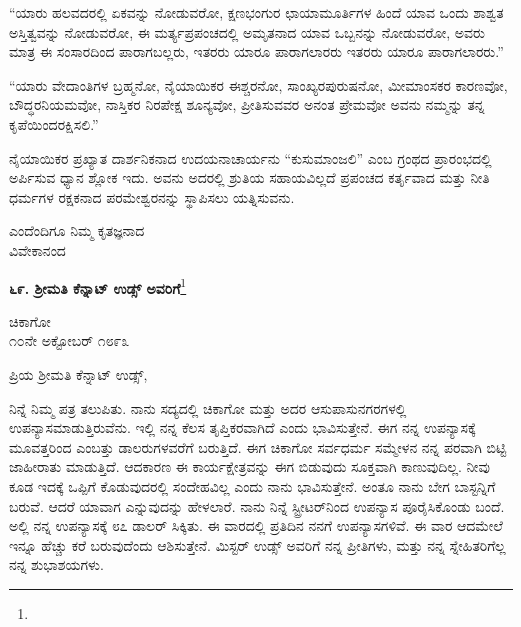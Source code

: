 “ಯಾರು ಹಲವದರಲ್ಲಿ ಏಕವನ್ನು ನೋಡುವರೋ, ಕ್ಷಣಭಂಗುರ ಛಾಯಾಮೂರ್ತಿ\break ಗಳ ಹಿಂದೆ ಯಾವ ಒಂದು ಶಾಶ್ವತ ಅಸ್ತಿತ್ವವನ್ನು ನೋಡುವರೋ, ಈ ಮರ್ತ್ಯಪ್ರಪಂಚದಲ್ಲಿ ಅಮೃತನಾದ ಯಾವ ಒಬ್ಬನನ್ನು ನೋಡುವರೋ, ಅವರು ಮಾತ್ರ ಈ ಸಂಸಾರದಿಂದ ಪಾರಾಗಬಲ್ಲರು, ಇತರರು ಯಾರೂ ಪಾರಾಗಲಾರರು\enginline{-} ಇತರರು ಯಾರೂ ಪಾರಾಗಲಾರರು.”

“ಯಾರು ವೇದಾಂತಿಗಳ ಬ್ರಹ್ಮನೋ, ನೈಯಾಯಿಕರ ಈಶ್ಚರನೋ, ಸಾಂಖ್ಯರ\break ಪುರುಷನೋ, ಮೀಮಾಂಸಕರ ಕಾರಣವೋ, ಬೌದ್ಧರನಿಯಮವೋ, ನಾಸ್ತಿಕರ ನಿರಪೇಕ್ಷ ಶೂನ್ಯವೋ, ಪ್ರೀತಿಸುವವರ ಅನಂತ ಪ್ರೇಮವೋ ಅವನು ನಮ್ಮನ್ನು ತನ್ನ ಕೃಪೆಯಿಂದ\break ರಕ್ಷಿಸಲಿ.”

ನೈಯಾಯಿಕರ ಪ್ರಖ್ಯಾತ ದಾರ್ಶನಿಕನಾದ ಉದಯನಾಚಾರ್ಯನು “ಕುಸುಮಾಂಜಲಿ” ಎಂಬ ಗ್ರಂಥದ ಪ್ರಾರಂಭದಲ್ಲಿ ಅರ್ಪಿಸುವ ಧ್ಯಾನ ಶ್ಲೋಕ ಇದು. ಅವನು ಅದರಲ್ಲಿ ಶ್ರುತಿಯ ಸಹಾಯವಿಲ್ಲದೆ ಪ್ರಪಂಚದ ಕರ್ತೃವಾದ ಮತ್ತು ನೀತಿ ಧರ್ಮಗಳ ರಕ್ಷಕನಾದ ಪರಮೇಶ್ವರನನ್ನು ಸ್ಥಾಪಿಸಲು ಯತ್ನಿಸುವನು.

\vspace{-.5cm}

{\flushright
ಎಂದೆಂದಿಗೂ ನಿಮ್ಮ ಕೃತಜ್ಞನಾದ\\ವಿವೇಕಾನಂದ\par}

\vspace{-.3cm}

\begin{center}
\textbf{೬೯. ಶ‍್ರೀಮತಿ ಕೆನ್ನಾಟ್ ಉಡ್ಸ್ ಅವರಿಗೆ}\footnote{}
\end{center}

\vspace{-.6cm}

\begin{flushright}
ಚಿಕಾಗೋ\\೧೦ನೇ ಅಕ್ಟೋಬರ್ ೧೮೯೩
\end{flushright}

\noindent
ಪ್ರಿಯ ಶ‍್ರೀಮತಿ ಕೆನ್ನಾಟ್ ಉಡ್ಸ್,

ನಿನ್ನೆ ನಿಮ್ಮ ಪತ್ರ ತಲುಪಿತು. ನಾನು ಸದ್ಯದಲ್ಲಿ ಚಿಕಾಗೋ ಮತ್ತು ಅದರ ಆಸುಪಾಸುನಗರಗಳಲ್ಲಿ ಉಪನ್ಯಾಸಮಾಡುತ್ತಿರುವೆನು. ಇಲ್ಲಿ ನನ್ನ ಕೆಲಸ ತೃಪ್ತಿಕರವಾಗಿದೆ ಎಂದು ಭಾವಿಸುತ್ತೇನೆ. ಈಗ ನನ್ನ ಉಪನ್ಯಾಸಕ್ಕೆ ಮೂವತ್ತರಿಂದ ಎಂಬತ್ತು ಡಾಲರುಗಳವರೆಗೆ ಬರುತ್ತಿದೆ. ಈಗ ಚಿಕಾಗೋ ಸರ್ವಧರ್ಮ ಸಮ್ಮೇಳನ ನನ್ನ ಪರವಾಗಿ ಬಿಟ್ಟಿ ಜಾಹೀರಾತು ಮಾಡುತ್ತಿದೆ. ಆದಕಾರಣ ಈ ಕಾರ್ಯಕ್ಷೇತ್ರವನ್ನು ಈಗ ಬಿಡುವುದು ಸೂಕ್ತವಾಗಿ ಕಾಣುವುದಿಲ್ಲ. ನೀವು ಕೂಡ ಇದಕ್ಕೆ ಒಪ್ಪಿಗೆ ಕೊಡುವುದರಲ್ಲಿ ಸಂದೇಹವಿಲ್ಲ ಎಂದು ನಾನು ಭಾವಿಸುತ್ತೇನೆ. ಅಂತೂ ನಾನು ಬೇಗ ಬಾಸ್ಟನ್ನಿಗೆ ಬರುವೆ. ಆದರೆ ಯಾವಾಗ ಎನ್ನುವುದನ್ನು ಹೇಳಲಾರೆ. ನಾನು ನಿನ್ನೆ ಸ್ಟ್ರೀಟರ್‌ನಿಂದ ಉಪನ್ಯಾಸ ಪೂರೈಸಿಕೊಂಡು ಬಂದೆ. ಅಲ್ಲಿ ನನ್ನ ಉಪನ್ಯಾಸಕ್ಕೆ ೮೭ ಡಾಲರ್ ಸಿಕ್ಕಿತು. ಈ ವಾರದಲ್ಲಿ ಪ್ರತಿದಿನ ನನಗೆ ಉಪನ್ಯಾಸಗಳಿವೆ. ಈ ವಾರ ಆದಮೇಲೆ ಇನ್ನೂ ಹೆಚ್ಚು ಕರೆ ಬರುವುದೆಂದು ಆಶಿಸುತ್ತೇನೆ. ಮಿಸ್ಟರ್ ಉಡ್ಸ್ ಅವರಿಗೆ ನನ್ನ ಪ್ರೀತಿಗಳು, ಮತ್ತು ನನ್ನ ಸ್ನೇಹಿತರಿಗೆಲ್ಲ ನನ್ನ ಶುಭಾಶಯಗಳು.
\vspace{-0.3cm}

